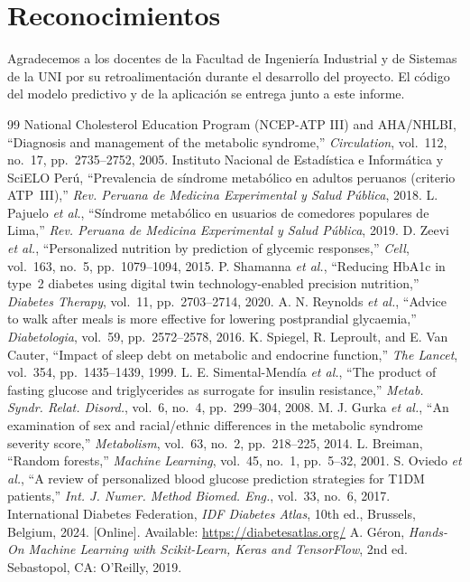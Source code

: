 \documentclass[9pt,letterpaper,twocolumn]{extarticle}
\begin{document}
\section*{Reconocimientos}
\small
Agradecemos a los docentes de la Facultad de Ingeniería Industrial y de Sistemas
de la UNI por su retroalimentación durante el desarrollo del proyecto. El código
del modelo predictivo y de la aplicación se entrega junto a este informe.

\begin{thebibliography}{99}
\footnotesize
{} National Cholesterol Education Program (NCEP-ATP III) and
AHA/NHLBI, ``Diagnosis and management of the metabolic syndrome,''
\textit{Circulation}, vol.~112, no.~17, pp.~2735--2752, 2005.
 Instituto Nacional de Estadística e Informática y SciELO
Perú, ``Prevalencia de síndrome metabólico en adultos peruanos (criterio
ATP~III),'' \textit{Rev. Peruana de Medicina Experimental y Salud Pública},
2018.
 L. Pajuelo \textit{et al.}, ``Síndrome metabólico en
usuarios de comedores populares de Lima,'' \textit{Rev. Peruana de Medicina
Experimental y Salud Pública}, 2019.
 D. Zeevi \textit{et al.}, ``Personalized nutrition by prediction
of glycemic responses,'' \textit{Cell}, vol.~163, no.~5, pp.~1079--1094, 2015.
 P. Shamanna \textit{et al.}, ``Reducing HbA1c in type~2
diabetes using digital twin technology-enabled precision nutrition,''
\textit{Diabetes Therapy}, vol.~11, pp.~2703--2714, 2020.
 A. N. Reynolds \textit{et al.}, ``Advice to walk after meals
is more effective for lowering postprandial glycaemia,'' \textit{Diabetologia},
vol.~59, pp.~2572--2578, 2016.
 K. Spiegel, R. Leproult, and E. Van Cauter, ``Impact of sleep
debt on metabolic and endocrine function,'' \textit{The Lancet}, vol.~354,
pp.~1435--1439, 1999.
 L. E. Simental-Mendía \textit{et al.}, ``The product of fasting
glucose and triglycerides as surrogate for insulin resistance,'' \textit{Metab.
Syndr. Relat. Disord.}, vol.~6, no.~4, pp.~299--304, 2008.
 M. J. Gurka \textit{et al.}, ``An examination of sex and
racial/ethnic differences in the metabolic syndrome severity score,''
\textit{Metabolism}, vol.~63, no.~2, pp.~218--225, 2014.
 L. Breiman, ``Random forests,'' \textit{Machine Learning},
vol.~45, no.~1, pp.~5--32, 2001.
 S. Oviedo \textit{et al.}, ``A review of personalized blood
glucose prediction strategies for T1DM patients,'' \textit{Int. J. Numer.
Method Biomed. Eng.}, vol.~33, no.~6, 2017.
 International Diabetes Federation, \textit{IDF Diabetes Atlas},
10th ed., Brussels, Belgium, 2024. [Online]. Available:
\url{https://diabetesatlas.org/}
 A. Géron, \textit{Hands-On Machine Learning with Scikit-Learn,
Keras and TensorFlow}, 2nd ed. Sebastopol, CA: O'Reilly, 2019.
\end{thebibliography}
\end{document}
